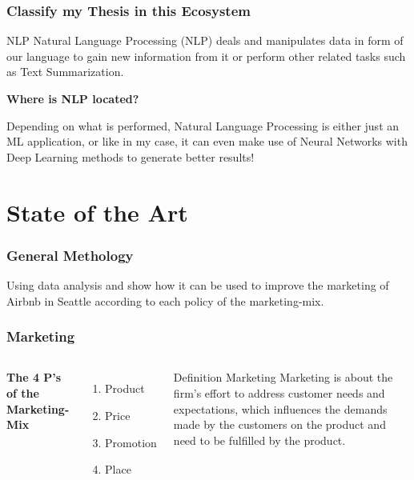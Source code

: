 \documentclass{beamer}
\begin{document}

\begin{frame}
\frametitle{Classify my Thesis in this Ecosystem}
\begin{block}{NLP}
	Natural Language Processing (NLP) deals and manipulates data in form of our language to gain new information from it or perform other related tasks such as Text Summarization.
\end{block}

\begin{center}
	\textbf{Where is NLP located?} \\
\end{center}

Depending on what is performed, Natural Language Processing is either just an ML application, or like in my case, it can even make use of Neural Networks with Deep Learning methods to generate better results!

\end{frame}

\section{State of the Art}
\begin{frame}
\frametitle{General Methology}
Using data analysis and show how it can be used to improve the marketing of Airbnb in Seattle according to each policy of the marketing-mix.
\end{frame}
%
%
\begin{frame}
\frametitle{Marketing}
\begin{columns}[c] %

\textbf{The 4 P's of the Marketing-Mix}
\begin{enumerate}
\item Product
\item Price
\item Promotion
\item Place
\end{enumerate}


\begin{block}{Definition Marketing}
Marketing is about the firm’s effort to address customer needs and expectations, which influences the demands made by the customers on the product and need to be fulfilled by the product.
\end{block}
\end{columns}
\end{frame}
\end{document}
